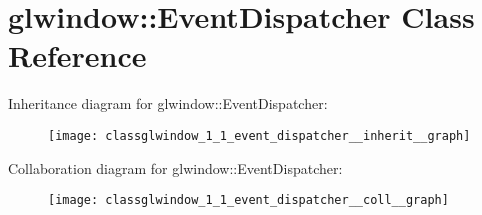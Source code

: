 \section{glwindow\+:\+:Event\+Dispatcher Class Reference}
\label{classglwindow_1_1_event_dispatcher}


Inheritance diagram for glwindow\+:\+:Event\+Dispatcher\+:\nopagebreak
\begin{figure}[H]
\begin{center}
\leavevmode
\texttt{[image: classglwindow\_1\_1\_event\_dispatcher\_\_inherit\_\_graph]}
\end{center}
\end{figure}


Collaboration diagram for glwindow\+:\+:Event\+Dispatcher\+:\nopagebreak
\begin{figure}[H]
\begin{center}
\leavevmode
\texttt{[image: classglwindow\_1\_1\_event\_dispatcher\_\_coll\_\_graph]}
\end{center}
\end{figure}
